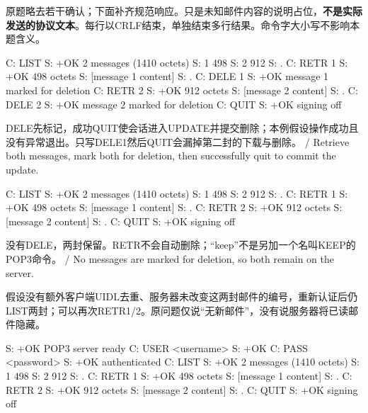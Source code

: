 原题略去若干确认；下面补齐规范响应。只是未知邮件内容的说明占位，\textbf{不是实际发送的协议文本}。每行以CRLF结束，单独结束多行结果。命令字大小写不影响本题含义。






\begin{StudyCode}
C: LIST
S: +OK 2 messages (1410 octets)
S: 1 498
S: 2 912
S: .
C: RETR 1
S: +OK 498 octets
S: [message 1 content]
S: .
C: DELE 1
S: +OK message 1 marked for deletion
C: RETR 2
S: +OK 912 octets
S: [message 2 content]
S: .
C: DELE 2
S: +OK message 2 marked for deletion
C: QUIT
S: +OK signing off
\end{StudyCode}


DELE先标记，成功QUIT使会话进入UPDATE并提交删除；本例假设操作成功且没有异常退出。只写DELE1然后QUIT会漏掉第二封的下载与删除。 / Retrieve both messages, mark both for deletion, then successfully quit to commit the update.






\begin{StudyCode}
C: LIST
S: +OK 2 messages (1410 octets)
S: 1 498
S: 2 912
S: .
C: RETR 1
S: +OK 498 octets
S: [message 1 content]
S: .
C: RETR 2
S: +OK 912 octets
S: [message 2 content]
S: .
C: QUIT
S: +OK signing off
\end{StudyCode}


没有DELE，两封保留。RETR不会自动删除；“keep”不是另加一个名叫KEEP的POP3命令。 / No messages are marked for deletion, so both remain on the server.





假设没有额外客户端UIDL去重、服务器未改变这两封邮件的编号，重新认证后仍LIST两封；可以再次RETR1/2。原问题仅说“无新邮件”，没有说服务器将已读邮件隐藏。



\begin{StudyCode}
S: +OK POP3 server ready
C: USER <username>
S: +OK
C: PASS <password>
S: +OK authenticated
C: LIST
S: +OK 2 messages (1410 octets)
S: 1 498
S: 2 912
S: .
C: RETR 1
S: +OK 498 octets
S: [message 1 content]
S: .
C: RETR 2
S: +OK 912 octets
S: [message 2 content]
S: .
C: QUIT
S: +OK signing off
\end{StudyCode}


